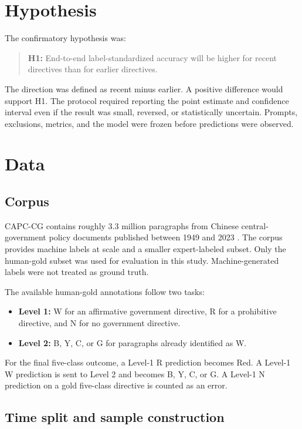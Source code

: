 \documentclass[11pt]{article}
\begin{document}
\section{Hypothesis}

The confirmatory hypothesis was:

\begin{quote}
\textbf{H1:} End-to-end label-standardized accuracy will be higher for recent directives than for earlier directives.
\end{quote}

The direction was defined as recent minus earlier. A positive difference would support H1. The protocol required reporting the point estimate and confidence interval even if the result was small, reversed, or statistically uncertain. Prompts, exclusions, metrics, and the model were frozen before predictions were observed.

\section{Data}

\subsection{Corpus}

CAPC-CG contains roughly 3.3 million paragraphs from Chinese central-government policy documents published between 1949 and 2023 \cite{sun2026}. The corpus provides machine labels at scale and a smaller expert-labeled subset. Only the human-gold subset was used for evaluation in this study. Machine-generated labels were not treated as ground truth.

The available human-gold annotations follow two tasks:

\begin{itemize}
    \item \textbf{Level 1:} W for an affirmative government directive, R for a prohibitive directive, and N for no government directive.
    \item \textbf{Level 2:} B, Y, C, or G for paragraphs already identified as W.
\end{itemize}

For the final five-class outcome, a Level-1 R prediction becomes Red. A Level-1 W prediction is sent to Level 2 and becomes B, Y, C, or G. A Level-1 N prediction on a gold five-class directive is counted as an error.

\subsection{Time split and sample construction}
\end{document}
